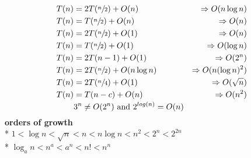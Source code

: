 \documentclass[10pt, landscape]{article}
\newenvironment{tightcenter}{%
  \setlength\topsep{0pt}
  \setlength\parskip{0pt}
  \begin{center}
}{%
  \end{center}
}
\let\then\rightarrow
\begin{document}
\begin{multicols}{4}
\begin{tightcenter}
\begin{align*}
    T(n) &= 2T(\sfrac{n}{2}) + O(n) &\Rightarrow O(n \log n)
    \\ T(n) &= T(\sfrac{n}{2}) + O(n) &\Rightarrow O(n)
    \\ T(n) &= 2T(\sfrac{n}{2}) + O(1) &\Rightarrow O(n)
    \\ T(n) &= T(\sfrac{n}{2}) + O(1) &\Rightarrow O(\log n)
    \\ T(n) &= 2T(n - 1) + O(1) &\Rightarrow O(2^n)
    \\ T(n) &= 2T(\sfrac{n}{2}) + O(n \log n) &\Rightarrow O(n(\log n)^2)
    \\ T(n) &= 2T(\sfrac{n}{4}) + O(1) &\Rightarrow O(\sqrt{n})
    \\ T(n) &= T(n - c) + O(n) &\Rightarrow O(n^2)
    \\ & 3^n \neq O(2^n) \text{ and } 2^{log(n)} = O(n)
\end{align*}
\textbf{orders of growth}
\\* $1 < \log n < \sqrt{n} < n < n \log n < n^2 < 2^n < 2^{2n}$
\\* $\log_a n < n^a < a^n < n! < n^n$ 
\end{tightcenter}

\end{multicols}
\end{document}

